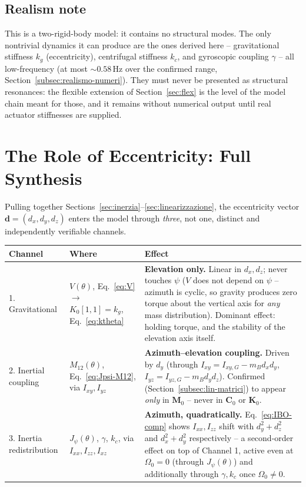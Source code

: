 \documentclass[11pt,a4paper]{article}
\numberwithin{equation}{section}
\newcommand{\bs}[1]{\boldsymbol{#1}}
\begin{document}
\subsection{Realism note}
\label{sec:realismo}

This is a two-rigid-body model: it contains no structural modes. The only nontrivial dynamics it can produce are the ones derived here -- gravitational stiffness $k_g$ (eccentricity), centrifugal stiffness $k_c$, and gyroscopic coupling $\gamma$ -- all low-frequency (at most $\sim0.58$\,Hz over the confirmed range, Section~\ref{subsec:realismo-numeri}). They must never be presented as structural resonances: the flexible extension of Section~\ref{sec:flex} is the level of the model chain meant for those, and it remains without numerical output until real actuator stiffnesses are supplied.

\section{The Role of Eccentricity: Full Synthesis}
\label{sec:sintesi-eccentricita}

Pulling together Sections~\ref{sec:inerzia}--\ref{sec:linearizzazione}, the eccentricity vector $\bs d=(d_x,d_y,d_z)$ enters the model through \emph{three}, not one, distinct and independently verifiable channels.

\begin{center}
\begin{tabular}{@{}p{}p{}p{}@{}}
\toprule
Channel & Where & Effect \\
\midrule
1. Gravitational & $V(\theta)$, Eq.~\eqref{eq:V} $\to$ $K_0[1,1]=k_g$, Eq.~\eqref{eq:ktheta} & \textbf{Elevation only.} Linear in $d_x,d_z$; never touches $\psi$ ($V$ does not depend on $\psi$ -- azimuth is cyclic, so gravity produces zero torque about the vertical axis for \emph{any} mass distribution). Dominant effect: holding torque, and the stability of the elevation axis itself. \\
2. Inertial coupling & $M_{12}(\theta)$, Eq.~\eqref{eq:Jpsi-M12}, via $I_{xy},I_{yz}$ & \textbf{Azimuth--elevation coupling.} Driven by $d_y$ (through $I_{xy}=I_{xy,G}-m_Bd_xd_y$, $I_{yz}=I_{yz,G}-m_Bd_yd_z$). Confirmed (Section~\ref{subsec:lin-matrici}) to appear \emph{only} in $\bs M_0$ -- never in $\bs C_0$ or $\bs K_0$. \\
3. Inertia redistribution & $J_\psi(\theta)$, $\gamma$, $k_c$, via $I_{xx},I_{zz},I_{xz}$ & \textbf{Azimuth, quadratically.} Eq.~\eqref{eq:IBO-comp} shows $I_{xx},I_{zz}$ shift with $d_y^2+d_z^2$ and $d_x^2+d_y^2$ respectively -- a second-order effect on top of Channel 1, active even at $\Omega_0=0$ (through $J_\psi(\theta)$) and additionally through $\gamma,k_c$ once $\Omega_0\ne0$. \\
\bottomrule
\end{tabular}
\end{center}
\end{document}

